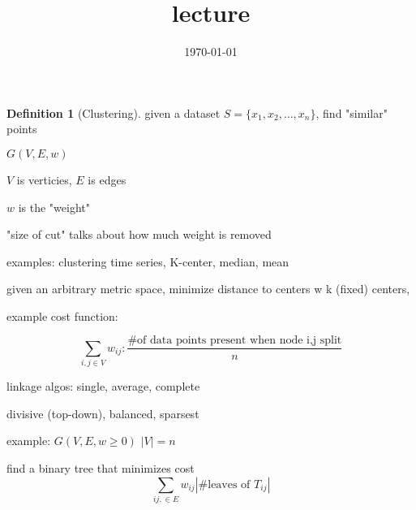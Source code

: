 \documentclass{article}
\title{lecture}
\date{\today}
\theoremstyle{definition}
\newtheorem{definition}{Definition}
\newcommand{\abs}[1]{\left| #1 \right|}
\begin{document}
\maketitle

\begin{definition}[Clustering]
    given a dataset \(S=\{x_1,x_2,\dots,x_n\}\), find "similar" points
\end{definition}

\(G(V,E,w)\)

\(V\) is verticies, \(E\) is edges

\(w \) is the "weight"

"size of cut" talks about how much weight is removed

examples: clustering time series, K-center, median, mean

given an arbitrary metric space, minimize distance to centers w k (fixed) centers, 





example cost function:

\begin{equation}
    \sum_{i,j\in V}w_{ij}: \frac{\text{\# of data points present when node i,j split}}{n}
\end{equation}




linkage algos: single, average, complete

divisive (top-down), balanced, sparsest


example:
\(G(V,E,w\geq 0)\) \(\abs{V}=n\)



find a binary tree that minimizes cost 
\begin{equation}
    \sum_{ij,\in E} w_{ij}\abs{\text{\# leaves of $T_{ij}$}}
\end{equation}
\end{document}
